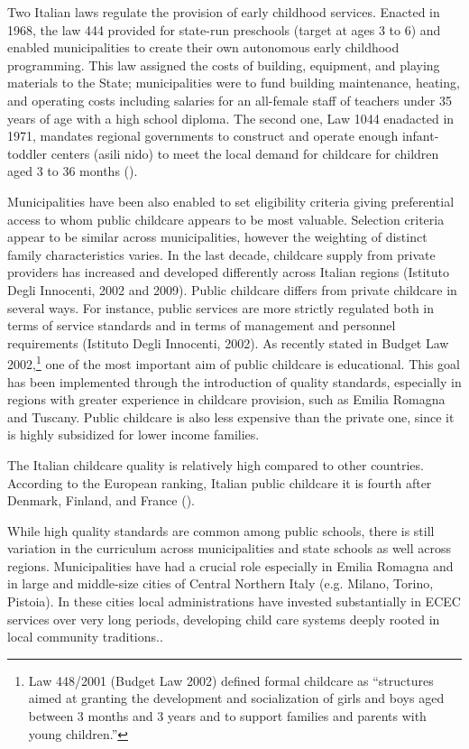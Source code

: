 \documentclass[12pt]{article}
\begin{document}
Two Italian laws regulate the provision of early childhood services. Enacted in 1968, the law 444 provided for state-run preschools (target at ages 3 to 6) and enabled municipalities to create their own autonomous early childhood programming. This law assigned the costs of building, equipment, and playing materials to the State; municipalities were to fund building maintenance, heating, and operating costs including salaries for an all-female staff of teachers under 35 years of age with a high school diploma. The second one, Law 1044 enadacted in 1971, mandates regional governments to construct and operate enough infant-toddler centers (asili nido) to meet the local demand for childcare for children aged 3 to 36 months (\cite{Brilli2016}).

Municipalities have been also enabled to set eligibility criteria giving preferential access to whom public childcare appears to be most valuable. Selection criteria appear to be similar across municipalities, however the weighting of distinct family characteristics varies. In the last decade, childcare supply from private providers has increased and developed differently across Italian regions (Istituto Degli Innocenti, 2002 and 2009). Public childcare differs from private childcare in several ways. For instance, public services are more strictly regulated both in terms of service standards and in terms of management and personnel requirements (Istituto Degli Innocenti, 2002). As recently stated in Budget Law 2002,\footnote{Law 448/2001 (Budget Law 2002) defined formal childcare as ``structures aimed at granting the development and socialization of girls and boys aged between 3 months and 3 years and to support families and parents with young children.''} one of the most important aim of public childcare is educational. This goal has been implemented through the introduction of quality standards, especially in regions with greater experience in childcare provision, such as Emilia Romagna and Tuscany. Public childcare is also less expensive than the private one, since it is highly subsidized for lower income families.

The Italian childcare quality is relatively high compared to other countries. According to the European ranking, Italian public childcare it is fourth after Denmark, Finland, and France (\cite{DeHenau2008}).

While high quality standards are common among public schools, there is still variation in the curriculum across municipalities and state schools as well across regions. Municipalities have had a crucial role especially in Emilia Romagna and in large and middle-size cities of Central Northern Italy (e.g. Milano, Torino, Pistoia). In these cities local administrations have invested substantially in ECEC services over very long periods, developing child care systems deeply rooted in local community traditions..
\end{document}

